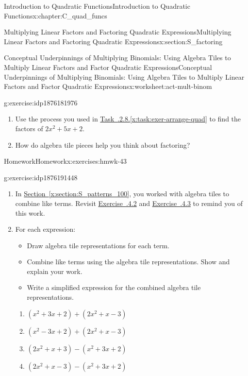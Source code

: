 \documentclass[oneside,10pt,]{book}
\newcommand{\xreffont}{\relax}
\numberwithin{equation}{chapter}
\begin{document}
\begin{chapterptx}{Introduction to Quadratic Functions}{}{Introduction to Quadratic Functions}{}{}{x:chapter:C_quad_funcs}
\begin{sectionptx}{Multiplying Linear Factors and Factoring Quadratic Expressions}{}{Multiplying Linear Factors and Factoring Quadratic Expressions}{}{}{x:section:S_factoring}
\begin{worksheet-subsection}{Conceptual Underpinnings of Multiplying Binomials: Using Algebra Tiles to Multiply Linear Factors and Factor Quadratic Expressions}{}{Conceptual Underpinnings of Multiplying Binomials: Using Algebra Tiles to Multiply Linear Factors and Factor Quadratic Expressions}{}{}{x:worksheet:act-mult-binom}
\begin{divisionexercise}{8}{}{}{g:exercise:idp1876181976}
\begin{enumerate}[font=\bfseries,label=(\alph*),ref=\alph*]
\item{}Use the process you used in \hyperref[x:task:exer-arrange-quad]{Task~{\xreffont 4.3.2.8}.{\xreffont\ref{x:task:exer-arrange-quad}}} to find the factors of \(2x^2 + 5x + 2\).%
\item{}How do algebra tile pieces help you think about factoring?%
\end{enumerate}
\end{divisionexercise}%
\end{worksheet-subsection}
\restoregeometry
%
%
\typeout{************************************************}
\typeout{************************************************}
%
\begin{exercises-subsection}{Homework}{}{Homework}{}{}{x:exercises:hmwk-43}
\begin{divisionexercise}{1}{}{}{g:exercise:idp1876191448}%
\begin{enumerate}[font=\bfseries,label=(\alph*),ref=\alph*]
\item{}In \hyperref[x:section:S_patterns_100]{Section~{\xreffont\ref{x:section:S_patterns_100}}}, you worked with algebra tiles to combine like terms. Revisit \hyperlink{x:exercise:exer-placeholder}{Exercise~{\xreffont 1.6.4.2}} and \hyperlink{x:exercise:exer-like-terms-tiles}{Exercise~{\xreffont 1.6.4.3}} to remind you of this work.%
\item{}For each expression:%
\begin{itemize}[label=\textbullet]
\item{}Draw algebra tile representations for each term.%
\item{}Combine like terms using the algebra tile representations. Show and explain your work.%
\item{}Write a simplified expression for the combined algebra tile representations.%
\end{itemize}
%
\begin{enumerate}[font=\bfseries,label=(\roman*),ref=\theenumi.\roman*]
\item{}\((x^2 + 3x + 2) + (2x^2 + x - 3)\)%
\item{}\((x^2 - 3x + 2) + (2x^2 + x - 3)\)%
\item{}\((2x^2 + x + 3) - (x^2 + 3x + 2)\)%
\item{}\((2x^2 + x - 3) - (x^2 + 3x + 2)\)%
\end{enumerate}
\end{enumerate}
\end{divisionexercise}%

\end{exercises-subsection}
\end{sectionptx}
\end{chapterptx}
\end{document}
